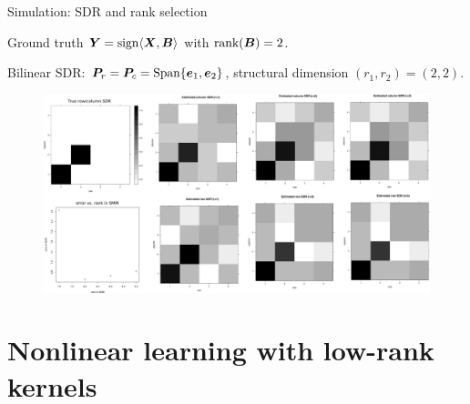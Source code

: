 \documentclass[compress,dvipsnames]{beamer}
\begin{document}
\begin{frame}{Simulation: SDR and rank selection}


Ground truth $\bm{Y}=\text{sign}\langle \bm{X},\bm{B}\rangle$ with $\text{rank}(\bm{B})=2$.

Bilinear SDR: $\bm{P}_r=\bm{P}_c=\text{Span}\{\bm{e}_1,\bm{e}_2\}$, structural dimension $(r_1,r_2)=(2,2)$.
\begin{figure}
    \centering
    \includegraphics[width =.9 \textwidth]{rank_SDR.pdf}
    \end{figure}
    
\end{frame}



\section{Nonlinear learning with low-rank kernels}
\end{document}
